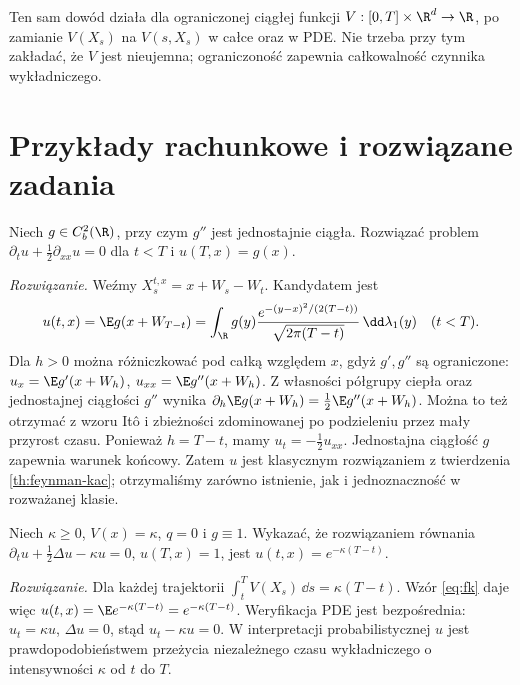 \begin{uwaga}
Ten sam dowód działa dla ograniczonej ciągłej funkcji
$V:[0,T]\times\R^d\to\R$, po zamianie
$V(X_s)$ na $V(s,X_s)$ w całce oraz w PDE.
Nie trzeba przy tym zakładać, że $V$ jest nieujemna;
ograniczoność zapewnia całkowalność czynnika wykładniczego.
\end{uwaga}

\section{Przykłady rachunkowe i rozwiązane zadania}

\begin{zadanie}
Niech $g\in C_b^2(\R)$, przy czym $g''$ jest
jednostajnie ciągła. Rozwiązać problem
$\partial_tu+\frac12\partial_{xx}u=0$ dla $t<T$
i $u(T,x)=g(x)$.

\emph{Rozwiązanie.} Weźmy $X_s^{t,x}=x+W_s-W_t$.
Kandydatem jest
\[
u(t,x)=\E g(x+W_{T-t})
=\int_\R g(y)\frac{e^{-(y-x)^2/(2(T-t))}}
{\sqrt{2\pi(T-t)}}\,\dd\lambda_1(y)
\quad(t<T).
\]
Dla $h>0$ można różniczkować pod całką względem $x$,
gdyż $g',g''$ są ograniczone: $u_x=\E g'(x+W_h)$,
$u_{xx}=\E g''(x+W_h)$.
Z własności półgrupy ciepła oraz jednostajnej ciągłości
$g''$ wynika
$\partial_h\E g(x+W_h)=\frac12\E g''(x+W_h)$.
Można to też otrzymać z wzoru Itô i zbieżności
zdominowanej po podzieleniu przez mały przyrost czasu.
Ponieważ $h=T-t$, mamy $u_t=-\frac12u_{xx}$.
Jednostajna ciągłość $g$ zapewnia warunek końcowy.
Zatem $u$ jest klasycznym rozwiązaniem z twierdzenia
\ref{th:feynman-kac}; otrzymaliśmy zarówno istnienie,
jak i jednoznaczność w rozważanej klasie.
\end{zadanie}

\begin{zadanie}
Niech $\kappa\ge0$, $V(x)=\kappa$, $q=0$ i $g\equiv1$.
Wykazać, że rozwiązaniem równania
$\partial_tu+\frac12\Delta u-\kappa u=0$,
$u(T,x)=1$, jest $u(t,x)=e^{-\kappa(T-t)}$.

\emph{Rozwiązanie.} Dla każdej trajektorii
$\int_t^TV(X_s)\,\dd s=\kappa(T-t)$.
Wzór \eqref{eq:fk} daje więc
$u(t,x)=\E e^{-\kappa(T-t)}=e^{-\kappa(T-t)}$.
Weryfikacja PDE jest bezpośrednia:
$u_t=\kappa u$, $\Delta u=0$, stąd
$u_t-\kappa u=0$. W interpretacji probabilistycznej
$u$ jest prawdopodobieństwem przeżycia niezależnego
czasu wykładniczego o intensywności $\kappa$ od $t$ do $T$.
\end{zadanie}

